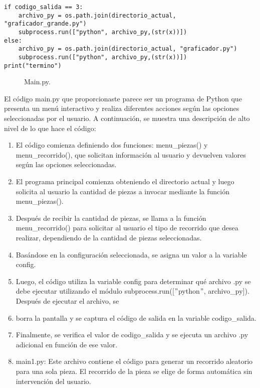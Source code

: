 \begin{enumerate}
\begin{lstlisting}
if codigo_salida == 3:
    archivo_py = os.path.join(directorio_actual, "graficador_grande.py")
    subprocess.run(["python", archivo_py,(str(x))])
else:
    archivo_py = os.path.join(directorio_actual, "graficador.py")
    subprocess.run(["python", archivo_py,(str(x))])
print("termino")
\end{lstlisting}
\begin{figure}[h]
\begin{center}
\end{center}
\caption{Main.py.}
\label{fig:imagen}
\end{figure}

El código main.py que proporcionaste parece ser un programa de Python que presenta un menú interactivo y realiza diferentes acciones según las opciones seleccionadas por el usuario. A continuación, se muestra una descripción de alto nivel de lo que hace el código:\newline

\begin{enumerate}
    \item El código comienza definiendo dos funciones: menu\_piezas() y menu\_recorrido(), que solicitan información al usuario y devuelven valores según las opciones seleccionadas.\newline
    \item El programa principal comienza obteniendo el directorio actual y luego solicita al usuario la cantidad de piezas a invocar mediante la función menu\_piezas().\newline
    \item Después de recibir la cantidad de piezas, se llama a la función menu\_recorrido() para solicitar al usuario el tipo de recorrido que desea realizar, dependiendo de la cantidad de piezas seleccionadas.\newline
    \item Basándose en la configuración seleccionada, se asigna un valor a la variable config.\newline
    \item Luego, el código utiliza la variable config para determinar qué archivo .py se debe ejecutar utilizando el módulo subprocess.run([$"$python$"$, archivo\_py]). Después de ejecutar el archivo, se \item borra la pantalla y se captura el código de salida en la variable codigo\_salida.\newline
    \item Finalmente, se verifica el valor de codigo\_salida y se ejecuta un archivo .py adicional en función de ese valor.\newline
    \item main1.py: Este archivo contiene el código para generar un recorrido aleatorio para una sola pieza. El recorrido de la pieza se elige de forma automática sin intervención del usuario.\newline


\end{enumerate}
\end{enumerate}
